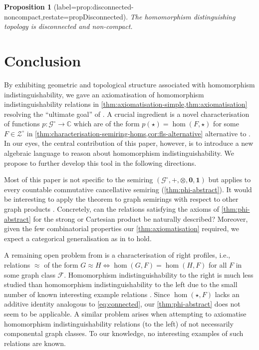 \documentclass[11pt]{scrartcl}
\theoremstyle{definition}
\theoremstyle{plain}
\newtheorem{proposition}[definition]{Proposition}
\theoremstyle{remark}
\newcommand{\lG}{\mathcal{G}^\circ}
\newcommand{\lZ}{\mathcal{Z}^\circ}
\newcommand{\C}{\mathbb{C}}
\begin{document}
	\begin{proposition}[label=prop:disconnected-noncompact,restate=propDisconnected]
		The homomorphism distinguishing topology is disconnected and non-compact.
	\end{proposition}
    


	\section{Conclusion}

    By exhibiting geometric and topological structure associated with homomorphism indistinguishability, we gave an axiomatisation of homomorphism indistinguishability relations in \cref{thm:axiomatisation-simple,thm:axiomatisation} resolving the \enquote{ultimate goal} of \textcite{atserias_expressive_2021}.
    A crucial ingredient is a novel characterisation of functions $p \colon \lG \to \C$ which are of the form $p(\star) = \hom(F, \star)$ for some $F \in \lZ$ in \cref{thm:characterisation-semiring-homs,cor:fls-alternative} alternative to \cite{lovasz_dual_2010}.
    In our eyes, the central contribution of this paper, however, is to introduce a new algebraic language to reason about homomorphism indistinguishability.
    We propose to further develop this tool in the following directions.


    Most of this paper is not specific to the semiring $(\lG, +, \otimes, \boldsymbol{0}, \boldsymbol{1})$ but applies to every countable commutative cancellative semiring (\cref{thm:phi-abstract}).
    It would be interesting to apply the theorem to graph semirings with respect to other graph products \cite{imrich_associative_1975,imrich_monoid_2025,campanelli_graph_2017,zuiddam_asymptotic_2019}.
    Concretely, can the relations satisfying the axioms of \cref{thm:phi-abstract} for the strong or Cartesian product be naturally described?
    Moreover, given the few combinatorial properties our \cref{thm:axiomatisation} required,
    we expect a categorical generalisation as in \cite{lovasz_semidefinite_2009} to hold.
    
    A remaining open problem from \cite{atserias_expressive_2021} is a characterisation of right profiles, i.e., relations $\approx$ of the form $G \approx H \iff \hom(G, F) = \hom(H, F)$ for all $F$ in some graph class $\mathcal{F}$.
    Homomorphism indistinguishability to the right is much less studied \cite{atserias_expressive_2021,dawar_homomorphism_2025} than homomorphism indistinguishability to the left due to the small number of known interesting example relations \cite[p.~32]{seppelt_homomorphism_2024}.
    Since $\hom(\star, F)$ lacks an additive identity analogous to \cref{eq:connected}, our \cref{thm:phi-abstract} does not seem to be applicable.
    A similar problem arises when attempting to axiomatise homomorphism indistinguishability relations (to the left) of not necessarily componental graph classes.
    To our knowledge, no interesting examples of such relations are known.
    
\end{document}
